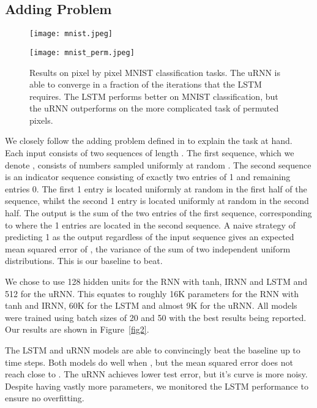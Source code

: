 \documentclass{article}
\begin{document}
\subsection{Adding Problem}

\begin{figure*}[t!]
  \begin{minipage}[b]{0.5\linewidth}
    \centering
    \texttt{[image: mnist.jpeg]}
  \end{minipage}\begin{minipage}[b]{0.5\linewidth}
    \centering
    \texttt{[image: mnist\_perm.jpeg]}
  \end{minipage}
  \caption{Results on pixel by pixel MNIST classification tasks. 
           The uRNN is able to converge in a fraction of the iterations
	    that the LSTM requires. The LSTM performs better on MNIST classification, 
	    but the uRNN outperforms on the more complicated task
	    of permuted pixels.}
  \label{fig3} 
\end{figure*}


We closely follow the adding problem defined in \cite{LSTM} to explain the task at hand.
Each input consists of two sequences of length . 
The first sequence, which we denote , consists of numbers sampled uniformly at random 
. 
The second sequence is an indicator sequence consisting of exactly two entries of 1 and remaining entries 0.
The first 1 entry is located uniformly at random in the first half of the sequence, whilst the second 1
entry is located uniformly at random in the second half.
The output is the sum of the two entries of the first sequence, corresponding to where the 1 entries are
located in the second sequence. A naive strategy of predicting 1 as the output regardless of the input sequence gives an expected mean
squared error of , the variance of the sum of two independent uniform distributions.
This is our baseline to beat.

We chose to use 128 hidden units for the RNN with tanh, IRNN and LSTM and 512 for the uRNN.
This equates to roughly 16K parameters for the RNN with tanh and IRNN, 60K for the LSTM and almost 9K for
the uRNN. All models were trained using batch sizes of 20 and 50 with the best results being reported.
Our results are shown in Figure~\ref{fig2}.

The LSTM and uRNN models are able to convincingly beat the baseline up to  time steps.
Both models do well when , but the mean squared error does not reach close to .
The uRNN achieves lower test error, but it's curve is more noisy. Despite having vastly more parameters,
we monitored the LSTM performance to ensure no overfitting.
\end{document}
